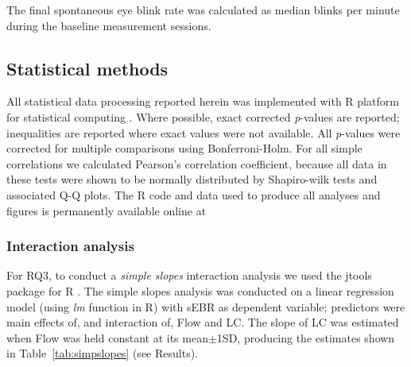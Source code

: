 The final spontaneous eye blink rate was calculated as median blinks per minute during the baseline measurement sessions.

\subsection*{Statistical methods}
All statistical data processing reported herein was implemented with {\sf R} platform for statistical computing \cite{R2014}. Where possible, exact corrected {\it p}-values are reported; inequalities are reported where exact values were not available. All {\it p}-values were corrected for multiple comparisons using Bonferroni-Holm. For all simple correlations we calculated Pearson's correlation coefficient, because all data in these tests were shown to be normally distributed by Shapiro-wilk tests and associated Q-Q plots. The {\sf R} code and data used to produce all analyses and figures is permanently available online at %


\subsubsection*{Interaction analysis}
For {\sf RQ3}, to conduct a {\it simple slopes} interaction analysis we used the {\sf jtools} package for {\sf R} \cite{jtools}. The simple slopes analysis was conducted on a linear regression model (using {\it lm} function in {\sf R}) with sEBR as dependent variable; predictors were main effects of, and interaction of, Flow and LC. The slope of LC was estimated when Flow was held constant at its mean$\pm$1SD, producing the estimates shown in Table~\ref{tab:simpslopes} (see Results).


